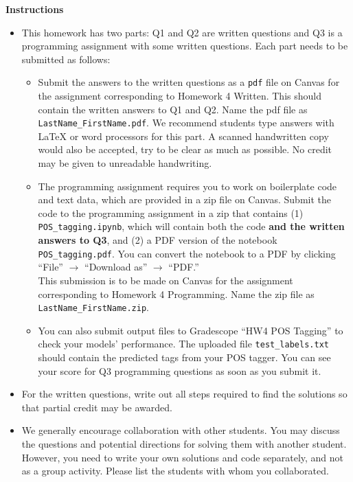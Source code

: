 \textbf{Instructions}

\begin{itemize}
\item This homework has two parts: Q1 and Q2 are written questions and Q3 is a programming assignment with some written questions. Each part needs to be submitted as follows:
    \begin{itemize}
        \item Submit the answers to the written questions as a \texttt{pdf} file on Canvas for the assignment corresponding to Homework 4 Written. 
        This should contain the written answers to Q1 and Q2. Name the pdf file as \texttt{LastName\_FirstName.pdf}. 
        We recommend students type answers with LaTeX or word processors for this part. 
        A scanned handwritten copy would also be accepted, try to be clear as much as possible. 
        No credit may be given to unreadable handwriting. 
        \item The programming assignment requires you to work on boilerplate code and text data, which are provided in a zip file on Canvas. 
        Submit the code to the programming assignment in a zip that contains (1) \texttt{POS\_tagging.ipynb}, which will contain both the code \textbf{and the written answers to Q3}, and (2) a PDF version of the notebook \texttt{POS\_tagging.pdf}.
        You can convert the notebook to a PDF by clicking ``File'' $\xrightarrow{}$ ``Download as'' $\xrightarrow{}$ ``PDF.'' \\
        This submission is to be made on Canvas for the assignment corresponding to Homework 4 Programming. 
        Name the zip file as \texttt{LastName\_FirstName.zip}.
        
        \item You can also submit output files to Gradescope ``HW4 POS Tagging'' to check your models' performance.
        The uploaded file \texttt{test\_labels.txt} should contain the predicted tags from your POS tagger.
        You can see your score for Q3 programming questions as soon as you submit it.
    \end{itemize}

    \item For the written questions, write out all steps required to find the solutions so that partial credit may be awarded.
    \item We generally encourage collaboration with other students. 
    You may discuss the questions and potential directions for solving them with another student. 
    However, you need to write your own solutions and code separately, and not as a group activity. 
    Please list the students with whom you collaborated.
\end{itemize}